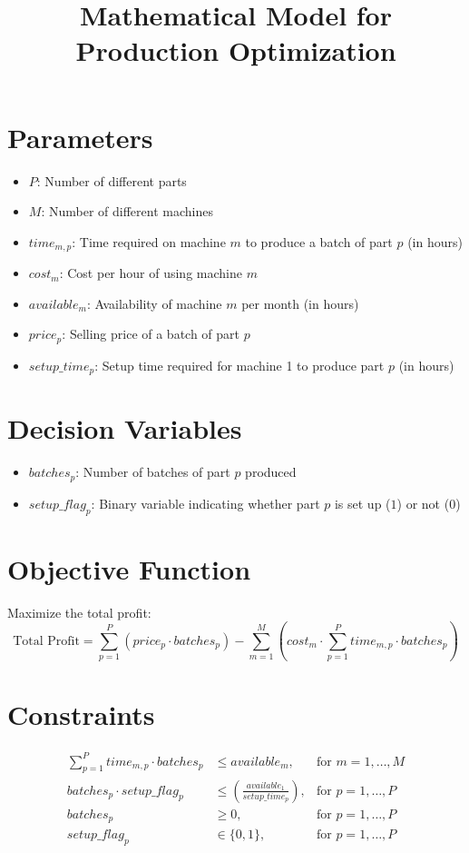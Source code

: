 \documentclass{article}
\begin{document}
\title{Mathematical Model for Production Optimization}
\author{}
\date{}
\maketitle

\section*{Parameters}
\begin{itemize}
    \item $P$: Number of different parts
    \item $M$: Number of different machines
    \item $time_{m,p}$: Time required on machine $m$ to produce a batch of part $p$ (in hours)
    \item $cost_{m}$: Cost per hour of using machine $m$
    \item $available_{m}$: Availability of machine $m$ per month (in hours)
    \item $price_{p}$: Selling price of a batch of part $p$
    \item $setup\_time_{p}$: Setup time required for machine 1 to produce part $p$ (in hours)
\end{itemize}

\section*{Decision Variables}
\begin{itemize}
    \item $batches_{p}$: Number of batches of part $p$ produced
    \item $setup\_flag_{p}$: Binary variable indicating whether part $p$ is set up ($1$) or not ($0$)
\end{itemize}

\section*{Objective Function}
Maximize the total profit:
\[
\text{Total Profit} = \sum_{p=1}^{P} (price_{p} \cdot batches_{p}) - \sum_{m=1}^{M} (cost_{m} \cdot \sum_{p=1}^{P} time_{m,p} \cdot batches_{p})
\]

\section*{Constraints}
\begin{align}
\sum_{p=1}^{P} time_{m,p} \cdot batches_{p} & \leq available_{m}, & \text{for } m = 1, \ldots, M \\
batches_{p} \cdot setup\_flag_{p} & \leq \left(\frac{available_{1}}{setup\_time_{p}}\right) , & \text{for } p = 1, \ldots, P \\
batches_{p} & \geq 0, & \text{for } p = 1, \ldots, P \\
setup\_flag_{p} & \in \{0, 1\}, & \text{for } p = 1, \ldots, P 
\end{align}
\end{document}
